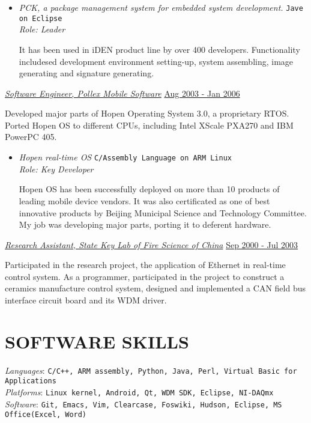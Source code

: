 \documentclass{res}
\begin{document}
\begin{resume}
\begin{itemize}
  \item {\sl PCK, a package management system for embedded system development.} \hfill \texttt{Jave on Eclipse}\\
    {\sl Role: Leader}

    It has been used in iDEN product line by over 400 developers. Functionality includesed development environment setting-up, system assembling, image generating and signature generating.
  \end{itemize}

  \uline{{\sl Software Engineer, Pollex Mobile Software}} \hfill                  \uline{Aug 2003 - Jan 2006}

  Developed major parts of Hopen Operating System 3.0, a proprietary RTOS. Ported Hopen OS to different CPUs, including Intel XScale PXA270 and IBM PowerPC 405. 

  \begin{itemize}
  \item {\sl Hopen real-time OS }                                      \hfill \texttt{C/Assembly Language on ARM Linux}\\
  {\sl Role: Key Developer}

  Hopen OS has been successfully deployed on more than 10 products of leading mobile device vendors. It was also certificated as one of best innovative products by Beijing Municipal Science and Technology Committee. My job was developing major parts, porting it to deferent hardware.
  \end{itemize}

  \uline{{\sl Research Assistant, State Key Lab of Fire Science of China}} \hfill                 \uline{Sep 2000 - Jul 2003}

  Participated in the research project, the application of Ethernet in real-time
  control system. As a programmer, participated in the project to construct a ceramics
  manufacture control system, designed and implemented a CAN field bus interface
  circuit board and its WDM driver.


  \section{SOFTWARE SKILLS}
  \vspace{0.1in}

  {\sl Languages}: \texttt{C/C++, ARM assembly, Python, Java, Perl, Virtual Basic for Applications}\\
  {\sl Platforms}: \texttt{Linux kernel, Android, Qt, WDM SDK, Eclipse, NI-DAQmx}\\
  {\sl Software}: \texttt{Git, Emacs, Vim, Clearcase, Foswiki, Hudson, Eclipse, MS Office(Excel, Word)}



\end{resume}
\end{document}
